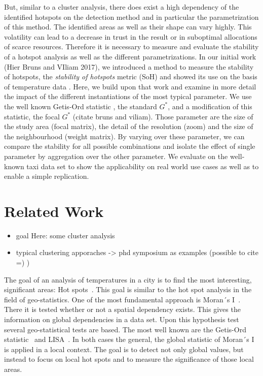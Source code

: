 \documentclass{itatnew}
\begin{document}
But, similar to a cluster analysis, there does exist a high dependency of the identified hotspots on the detection method and in particular the parametrization of this method. The identified areas as well as their shape can vary highly. This volatility can lead to a decrease in trust in the result or in suboptimal allocations of scarce resources. Therefore it is necessary to measure and evaluate the stability of a hotspot analysis as well as the different parametrizations. 
In our initial work (Hier Bruns and VIliam 2017), we introduced a method to measure the stability of hotspots, the \emph{stability of hotspots} metric (SoH) and showed its use on the basis of temperature data .   
Here, we build upon that work and examine in more detail the impact of the different instantiations of the most typical parameter. We use the well known Getis-Ord statistic \cite{Ord.1995}, the standard $G^*$, and a modification of this statistic, the focal $G^*$ (citate bruns and viliam). Those parameter are the size of the study area (focal matrix), the detail of the resolution (zoom) and the size of the neighbourhood (weight matrix). By varying over these parameter, we can compare the stability for all possible combinations and isolate the effect of single parameter by aggregation over the other parameter. 
We evaluate on the well-known taxi data set to show the applicability on real world use cases as well as to enable a simple replication. 


\section{Related Work}


\begin{itemize}
\item goal Here: some cluster analysis
\item typical clustering apporaches -> phd symposium as examples (possible to cite =) )
\end{itemize}


The goal of an analysis of temperatures in a city is to find the most
interesting, significant areas: Hot spots~\cite{Martin.2015}. This goal is
similar to the hot spot analysis in the field of geo-statistics. One of the most
fundamental approach is Moran´s I~\cite{MoranI}. There it is tested whether or
not a spatial dependency exists. This gives the information on global
dependencies in a data set. Upon this hypothesis test several geo-statistical
tests are based. The most well known are the Getis-Ord statistic~\cite{Ord.1995}
and LISA~\cite{Anselin.1995}. In both cases the general, the global statistic of
Moran´s I is applied in a local context. The goal is to detect not only global
values, but instead to focus on local hot spots and to measure the significance
of those local areas.
\end{document}
